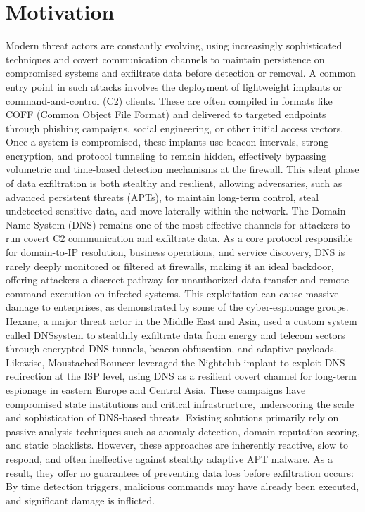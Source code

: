 \documentclass [11pt, proquest] {uwthesis}[2020/02/24]
\begin{document}
\section{Motivation}
Modern threat actors are constantly evolving, using increasingly sophisticated techniques and covert communication channels to maintain persistence on compromised systems and exfiltrate data before detection or removal. A common entry point in such attacks involves the deployment of lightweight implants or command-and-control (C2) clients. These are often compiled in formats like COFF (Common Object File Format) and delivered to targeted endpoints through phishing campaigns, social engineering, or other initial access vectors.
Once a system is compromised, these implants use beacon intervals, strong encryption, and protocol tunneling to remain hidden, effectively bypassing volumetric and time-based detection mechanisms at the firewall. This silent phase of data exfiltration is both stealthy and resilient, allowing adversaries, such as advanced persistent threats (APTs), to maintain long-term control, steal undetected sensitive data, and move laterally within the network.
The Domain Name System (DNS) remains one of the most effective channels for attackers to run covert C2 communication and exfiltrate data. As a core protocol responsible for domain-to-IP resolution, business operations, and service discovery, DNS is rarely deeply monitored or filtered at firewalls, making it an ideal backdoor, offering attackers a discreet pathway for unauthorized data transfer and remote command execution on infected systems. 
This exploitation can cause massive damage to enterprises, as demonstrated by some of the cyber-espionage groups. Hexane, a major threat actor in the Middle East and Asia, used a custom system called DNSsystem to stealthily exfiltrate data from energy and telecom sectors through encrypted DNS tunnels, beacon obfuscation, and adaptive payloads. Likewise, MoustachedBouncer leveraged the Nightclub implant to exploit DNS redirection at the ISP level, using DNS as a resilient covert channel for long-term espionage in eastern Europe and Central Asia. These campaigns have compromised state institutions and critical infrastructure, underscoring the scale and sophistication of DNS-based threats.
Existing solutions primarily rely on passive analysis techniques such as anomaly detection, domain reputation scoring, and static blacklists. However, these approaches are inherently reactive, slow to respond, and often ineffective against stealthy adaptive APT malware. As a result, they offer no guarantees of preventing data loss before exfiltration occurs: By time detection triggers, malicious commands may have already been executed, and significant damage is inflicted.
\end{document}

